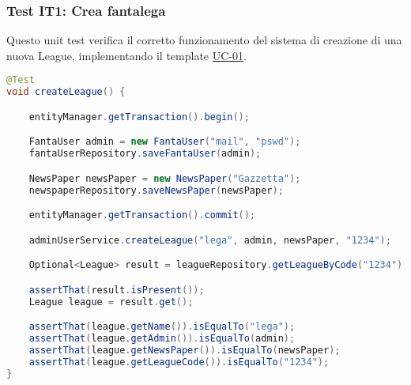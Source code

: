 \subsubsection{Test IT1: Crea fantalega} \label{IT1}

Questo unit test verifica il corretto funzionamento del sistema di creazione di una nuova League,
implementando il template \hyperref[UC-01]{UC-01}.

\begin{lstlisting}[language=Java]
@Test
void createLeague() {

	entityManager.getTransaction().begin();

	FantaUser admin = new FantaUser("mail", "pswd");
	fantaUserRepository.saveFantaUser(admin);

	NewsPaper newsPaper = new NewsPaper("Gazzetta");
	newspaperRepository.saveNewsPaper(newsPaper);

	entityManager.getTransaction().commit();

	adminUserService.createLeague("lega", admin, newsPaper, "1234");

    Optional<League> result = leagueRepository.getLeagueByCode("1234");

	assertThat(result.isPresent());
	League league = result.get();

	assertThat(league.getName()).isEqualTo("lega");
	assertThat(league.getAdmin()).isEqualTo(admin);
	assertThat(league.getNewsPaper()).isEqualTo(newsPaper);
	assertThat(league.getLeagueCode()).isEqualTo("1234");
}
\end{lstlisting}

